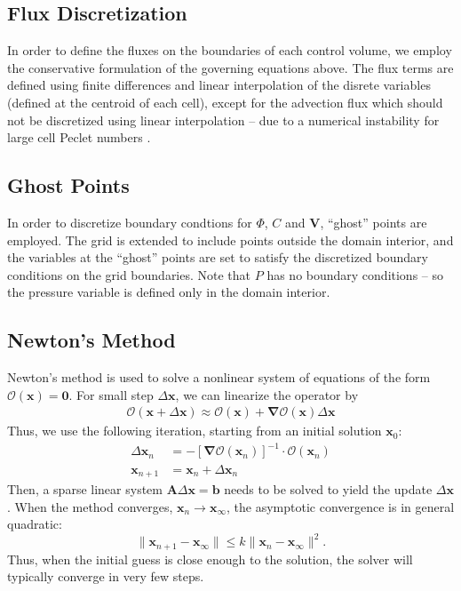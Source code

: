 \documentclass[MSc,beforeExam]{iitcsthesis}
\newcommand\bnabla{\boldsymbol{\nabla}}
\newcommand\bV{\boldsymbol{V}}
\newcommand\bx{\boldsymbol{x}}
\newcommand\bzero{\boldsymbol{0}}
\newcommand\cO{\mathcal{O}}
\begin{document}
\subsection{Flux Discretization}

In order to define the fluxes on the boundaries of each control volume, we employ the 
conservative formulation of the governing equations above. 
The flux terms are defined using finite differences and linear interpolation of the disrete 
variables (defined at the centroid of each cell), except for the advection flux which should not be 
discretized using linear interpolation -- due to a numerical instability 
for large cell Peclet numbers \cite{strikwerda2004finite}.

\subsection{Ghost Points}
In order to discretize boundary condtions for $\varPhi$, $C$ and $\bV$, 
``ghost'' points are employed. 
The grid is extended to include points outside the domain interior,
and the variables at the ``ghost'' points are set to satisfy 
the discretized boundary conditions on the grid boundaries.
Note that $P$ has no boundary conditions -- so the pressure variable is defined 
only in the domain interior.

\subsection{Newton's Method}
Newton's method is used to solve a nonlinear system of equations of the form $\cO(\bx) = \bzero$.
For small step $\Delta\bx$, we can linearize the operator by
\begin{align}
\cO(\bx + \Delta\bx) \approx \cO(\bx) + \bnabla \cO(\bx) \Delta\bx
\end{align}
Thus, we use the following iteration, starting from an initial solution $\bx_0$:
\begin{align}
\Delta\bx_n &= - \left[\bnabla \cO(\bx_n)\right]^{-1} \cdot \cO(\bx_n) \\
\bx_{n+1} &= \bx_n + \Delta\bx_n
\end{align}
Then, a sparse linear system $\boldsymbol{A} \Delta \bx = \boldsymbol{b}$
needs to be solved to yield the update $\Delta \bx$.
When the method converges, $\bx_n \rightarrow \bx_\infty$, 
the asymptotic convergence is in general quadratic:
\begin{equation}
\|\bx_{n+1} - \bx_\infty\| \le k \|\bx_{n} - \bx_\infty\|^2.
\end{equation}
Thus, when the initial guess is close enough to the solution, the solver
will typically converge in very few steps.
\end{document}
